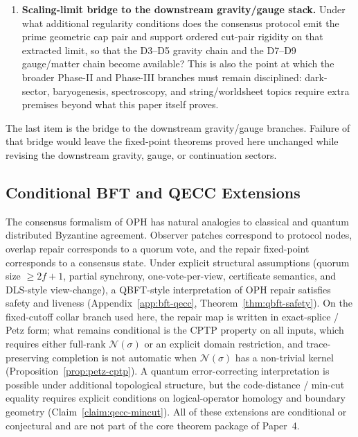\documentclass[11pt]{article}
\theoremstyle{remark}
\theoremstyle{plain}
\begin{document}
\begin{enumerate}
\item \textbf{Scaling-limit bridge to the downstream gravity/gauge stack.} Under what additional regularity conditions does the consensus protocol emit the prime geometric cap pair and support ordered cut-pair rigidity on that extracted limit, so that the D3--D5 gravity chain and the D7--D9 gauge/matter chain become available? This is also the point at which the broader Phase-II and Phase-III branches must remain disciplined: dark-sector, baryogenesis, spectroscopy, and string/worldsheet topics require extra premises beyond what this paper itself proves.
\end{enumerate}

The last item is the bridge to the downstream gravity/gauge branches. Failure of that bridge would
leave the fixed-point theorems proved here unchanged while revising the downstream gravity, gauge,
or continuation sectors.

\subsection{Conditional BFT and QECC Extensions}
\label{subsec:conditional-bft-qecc}

The consensus formalism of \textrm{OPH} has natural analogies to classical and quantum
distributed Byzantine agreement. Observer patches correspond to protocol nodes, overlap repair
corresponds to a quorum vote, and the repair fixed-point corresponds to a consensus state. Under
explicit structural assumptions (quorum size $\geq 2f+1$, partial synchrony, one-vote-per-view,
certificate semantics, and \textrm{DLS}-style view-change), a \textrm{QBFT}-style interpretation
of \textrm{OPH} repair satisfies safety and liveness (Appendix~\ref{app:bft-qecc},
Theorem~\ref{thm:qbft-safety}). On the fixed-cutoff collar branch used here, the repair map is
written in exact-splice / Petz form; what remains conditional is the \textrm{CPTP}
property on all inputs, which requires either full-rank $\mathcal{N}(\sigma)$ or an explicit
domain restriction, and trace-preserving completion is not automatic when
$\mathcal{N}(\sigma)$ has a non-trivial kernel
(Proposition~\ref{prop:petz-cptp}). A quantum error-correcting interpretation is possible under
additional topological structure, but the code-distance / min-cut equality requires explicit
conditions on logical-operator homology and boundary geometry (Claim~\ref{claim:qecc-mincut}). All
of these extensions are conditional or conjectural and are not part of the core theorem package of
Paper~4.
\end{document}
